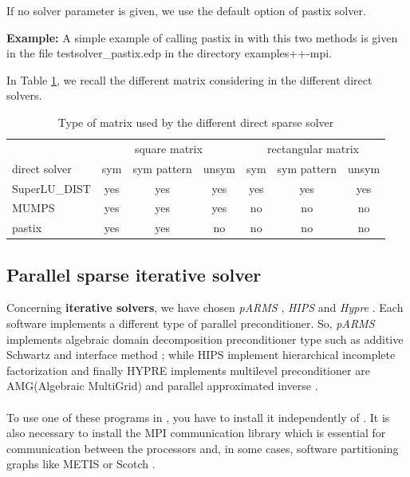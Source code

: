 \documentclass[a4paper,twoside,12pt]{book}
\begin{document}
If no solver parameter is given, we use the default option of pastix solver.
\begin{paragraph}
{\bf{Example:}}
A simple example of calling pastix in \freefempp with this two methods is given in the file testsolver\_pastix.edp in the directory examples++-mpi.\\
\end{paragraph}


In Table \ref{recap.direct.solveur}, we recall the different matrix considering in the different direct solvers.

\begin{table}
\begin{tabular}{|l|ccc|ccc|}\hline
                              & \multicolumn{3}{c}{square matrix} & \multicolumn{3}{|c|}{rectangular matrix} \\
direct solver         & sym & sym pattern & unsym  & sym & sym pattern & unsym \\ \hline
SuperLU\_DIST & yes & yes & yes & yes & yes &yes \\
MUMPS               & yes & yes & yes & no & no &no \\
pastix                   & yes & yes & no & no & no &no \\ \hline
\end{tabular}
\caption{Type of matrix used by the different direct sparse solver \label{recap.direct.solveur}}
\end{table}

\subsection{Parallel sparse iterative solver}


Concerning  \textbf{ iterative solvers}, we have chosen
\textit{pARMS} \cite{spARMS} , \textit{HIPS} \cite{HIPS} and  \textit{Hypre}
\cite{HYPRE}.
Each software implements a different type of parallel preconditioner.
So, \textit{pARMS} implements algebraic domain decomposition preconditioner type
such as additive Schwartz \cite{CAI89}
 and  interface method \cite{LISAAD}; while HIPS implement hierarchical
incomplete factorization \cite{A:LaBRI::sisc06}
 and finally HYPRE implements multilevel preconditioner are AMG(Algebraic
MultiGrid)
\cite{A:AMG::sisc00} and parallel approximated inverse \cite{A:PASA::sisc00}.
\\\\
To use one of these programs in \freefempp, you have to install it independently
of \freefempp.
It is also necessary to install the MPI communication library which is essential
for communication
between the processors and, in some cases, software partitioning graphs like
METIS \cite{metis} or Scotch \cite{scotch}.
\end{document}
